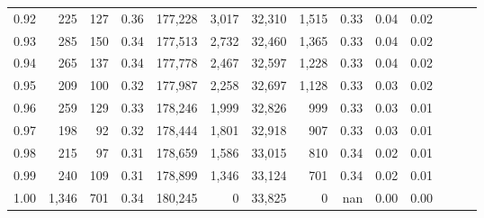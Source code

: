 \begin{tabular}{rrrrrrrrrrrrrr}
0.92 &    225 &  127 &  0.36 &  177,228 &    3,017 &  32,310 &   1,515 &  0.33 &  0.04 &      0.02 \\
0.93 &    285 &  150 &  0.34 &  177,513 &    2,732 &  32,460 &   1,365 &  0.33 &  0.04 &      0.02 \\
0.94 &    265 &  137 &  0.34 &  177,778 &    2,467 &  32,597 &   1,228 &  0.33 &  0.04 &      0.02 \\
0.95 &    209 &  100 &  0.32 &  177,987 &    2,258 &  32,697 &   1,128 &  0.33 &  0.03 &      0.02 \\
0.96 &    259 &  129 &  0.33 &  178,246 &    1,999 &  32,826 &     999 &  0.33 &  0.03 &      0.01 \\
0.97 &    198 &   92 &  0.32 &  178,444 &    1,801 &  32,918 &     907 &  0.33 &  0.03 &      0.01 \\
0.98 &    215 &   97 &  0.31 &  178,659 &    1,586 &  33,015 &     810 &  0.34 &  0.02 &      0.01 \\
0.99 &    240 &  109 &  0.31 &  178,899 &    1,346 &  33,124 &     701 &  0.34 &  0.02 &      0.01 \\
1.00 &  1,346 &  701 &  0.34 &  180,245 &        0 &  33,825 &       0 &   nan &  0.00 &      0.00 \\
\bottomrule
\end{tabular}
